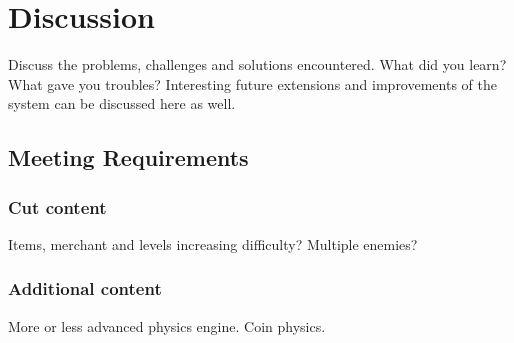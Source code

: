 \chapter{Discussion}

Discuss the problems, challenges and solutions encountered.
What did you learn? What gave you troubles? Interesting future extensions and
improvements of the system can be discussed here as well.


\section{Meeting Requirements}
\subsection{Cut content}
Items, merchant and levels
increasing difficulty?
Multiple enemies?
\subsection{Additional content}
More or less advanced physics engine.
Coin physics.